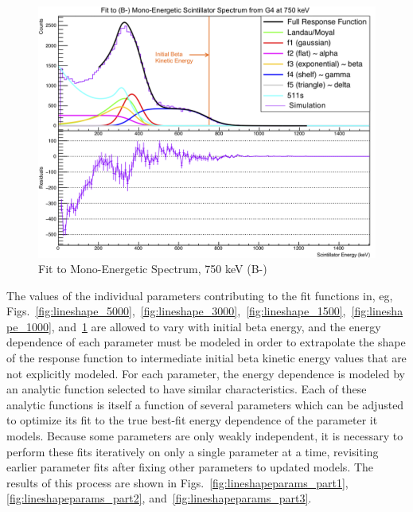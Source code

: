 \begin{figure}[h!!tb]
	\centering
	\includegraphics[width=.999\linewidth]
	{Figures/MonoFit_750.png}
	\caption[Fit to Mono-Energetic Spectrum, 750 keV]{Fit to Mono-Energetic Spectrum, 750 keV (B-)}	
	\label{fig:lineshape_750}
\end{figure}

The values of the individual parameters contributing to the fit functions in, eg, Figs.~\ref{fig:lineshape_5000},~\ref{fig:lineshape_3000},~\ref{fig:lineshape_1500},~\ref{fig:lineshape_1000}, and~\ref{fig:lineshape_750} are allowed to vary with initial beta energy, and the energy dependence of each parameter must be modeled in order to extrapolate the shape of the response function to intermediate initial beta kinetic energy values that are not explicitly modeled.  For each parameter, the energy dependence is modeled by an analytic function selected to have similar characteristics.  Each of these analytic functions is itself a function of several parameters which can be adjusted to optimize its fit to the true best-fit energy dependence of the parameter it models.  Because some parameters are only weakly independent, it is necessary to perform these fits iteratively on only a single parameter at a time, revisiting earlier parameter fits after fixing other parameters to updated models.  The results of this process are shown in Figs.~\ref{fig:lineshapeparams_part1}, \ref{fig:lineshapeparams_part2}, and~\ref{fig:lineshapeparams_part3}.


